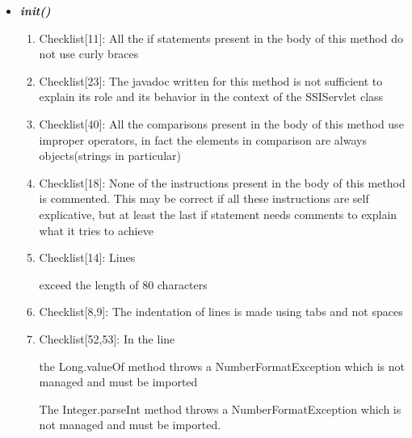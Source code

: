 \documentclass[11pt,titlepage]{article} %
\begin{document}
  \begin{itemize}
   \item \textbf{\textit{init()}}
   \begin{enumerate}
    \item Checklist[11]: All the if statements present in the body of this method do not use curly braces
    \item Checklist[23]: The javadoc written for this method is not sufficient to explain its role and its behavior in the context of the SSIServlet class
    \item Checklist[40]: All the comparisons present in the body of this method use improper operators, in fact the elements in comparison are always objects(strings in particular)
    \item Checklist[18]: None of the instructions present in the body of this method is commented. This may be correct if all these instructions are self explicative, but at least the last if statement needs comments to explain what it tries to achieve
    \item Checklist[14]: Lines
      
      
      
      
      
      exceed the length of 80 characters
    \item Checklist[8,9]: The indentation of lines is made using tabs and not spaces
    \item Checklist[52,53]: In the line
      
      the Long.valueOf method throws a NumberFormatException which is not managed and must be imported
      
      The Integer.parseInt method throws a NumberFormatException which is not managed and must be imported.
   \end{enumerate}


\end{itemize}
\end{document}
